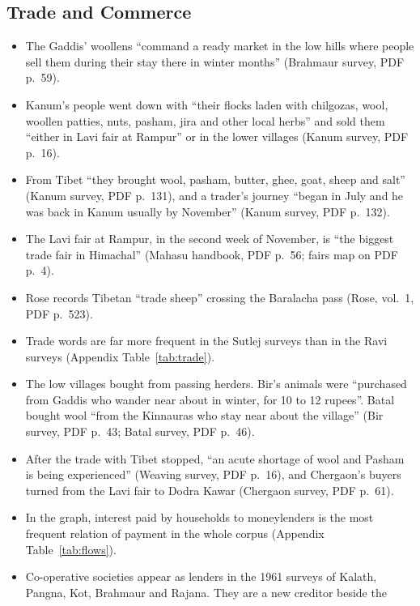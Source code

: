 \documentclass[11pt,a4paper]{article}
\newcommand{\cit}[1]{{\small(#1)}}
\begin{document}
\subsection{Trade and Commerce}
\begin{itemize}
\item The Gaddis' woollens \enquote{command a ready market in the low hills where
  people sell them during their stay there in winter months} \cit{Brahmaur
  survey, PDF p.~59}.
\item Kanum's people went down with \enquote{their flocks laden with chilgozas,
  wool, woollen patties, nuts, pasham, jira and other local herbs} and sold
  them \enquote{either in Lavi fair at Rampur} or in the lower villages
  \cit{Kanum survey, PDF p.~16}.
\item From Tibet \enquote{they brought wool, pasham, butter, ghee, goat, sheep
  and salt} \cit{Kanum survey, PDF p.~131}, and a trader's journey
  \enquote{began in July and he was back in Kanum usually by November}
  \cit{Kanum survey, PDF p.~132}.
\item The Lavi fair at Rampur, in the second week of November, is \enquote{the
  biggest trade fair in Himachal} \cit{Mahasu handbook, PDF p.~56; fairs map on
  PDF p.~4}.
\item Rose records Tibetan \enquote{trade sheep} crossing the Baralacha pass
  \cit{Rose, vol.~1, PDF p.~523}.
\item Trade words are far more frequent in the Sutlej surveys than in the Ravi
  surveys \cit{Appendix Table~\ref{tab:trade}}.
\item The low villages bought from passing herders. Bir's animals were
  \enquote{purchased from Gaddis who wander near about in winter, for 10 to 12
  rupees}. Batal bought wool \enquote{from the Kinnauras who stay near about the
  village} \cit{Bir survey, PDF p.~43; Batal survey, PDF p.~46}.
\item After the trade with Tibet stopped, \enquote{an acute shortage of wool and
  Pasham is being experienced} \cit{Weaving survey, PDF p.~16}, and Chergaon's
  buyers turned from the Lavi fair to Dodra Kawar \cit{Chergaon survey, PDF
  p.~61}.
\item In the graph, interest paid by households to moneylenders is the most
  frequent relation of payment in the whole corpus \cit{Appendix
  Table~\ref{tab:flows}}.
\item Co-operative societies appear as lenders in the 1961 surveys of Kalath,
  Pangna, Kot, Brahmaur and Rajana. They are a new creditor beside the

\end{itemize}
\end{document}

